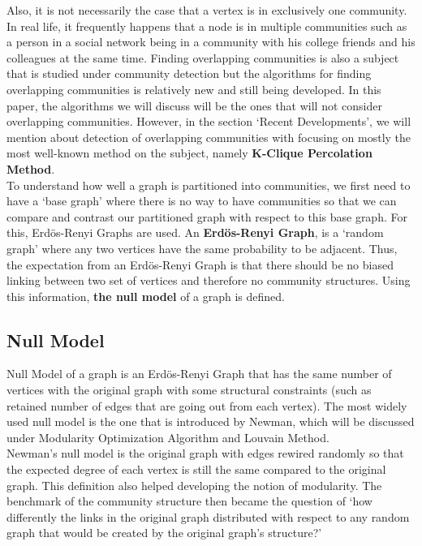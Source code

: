 \documentclass[10pt]{article}
\begin{document}
Also, it is not necessarily the case that a vertex is in exclusively one community. In real life, it frequently happens that a node is in multiple communities such as a person in a social network being in a community with his college friends and his colleagues at the same time. Finding overlapping communities is also a subject that is studied under community detection but the algorithms for finding overlapping communities is relatively new and still being developed. In this paper, the algorithms we will discuss will be the ones that will not consider overlapping communities. However, in the section ‘Recent Developments’, we will mention about detection of overlapping communities with focusing on mostly the most well-known method on the subject, namely \textbf{K-Clique Percolation Method}. \\

To understand how well a graph is partitioned into communities, we first need to have a ‘base graph’ where there is no way to have communities so that we can compare and contrast our partitioned graph with respect to this base graph. For this, Erdös-Renyi Graphs are used. An \textbf{Erdös-Renyi Graph}, is a ‘random graph’ where any two vertices have the same probability to be adjacent\cite{erdos}. Thus, the expectation from an Erdös-Renyi Graph is that there should be no biased linking between two set of vertices and therefore no community structures. Using this information, \textbf{the null model} of a graph is defined. \\

\subsection{Null Model}

Null Model of a graph is an Erdös-Renyi Graph that has the same number of vertices with the original graph with some structural constraints (such as retained number of edges that are going out from each vertex). The most widely used null model is the one that is introduced by Newman, which will be discussed under Modularity Optimization Algorithm and Louvain Method. \\

Newman’s null model is the original graph with edges rewired randomly so that the expected degree of each vertex is still the same compared to the original graph. This definition also helped developing the notion of modularity. The benchmark of the community structure then became the question of ‘how differently the links in the original graph distributed with respect to any random graph that would be created by the original graph’s structure?’ \\
\end{document}
